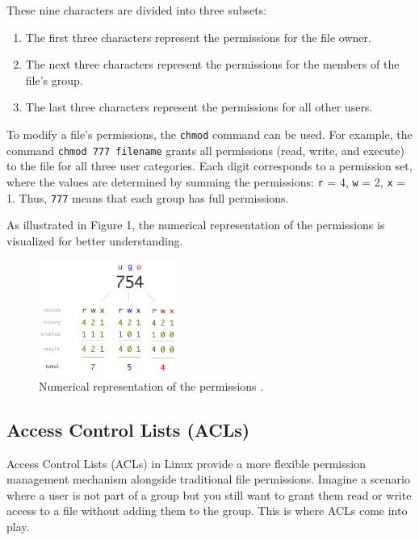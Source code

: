 \documentclass[conference]{IEEEtran}
\begin{document}
These nine characters are divided into three subsets:
\begin{enumerate}
    \item The first three characters represent the permissions for the file owner.
    \item The next three characters represent the permissions for the members of the file's group.
    \item The last three characters represent the permissions for all other users.
\end{enumerate}

To modify a file's permissions, the \texttt{chmod} command can be used. For example, the command \texttt{chmod 777 filename} grants all permissions (read, write, and execute) to the file for all three user categories. Each digit corresponds to a permission set, where the values are determined by summing the permissions: \texttt{r} = 4, \texttt{w} = 2, \texttt{x} = 1. Thus, \texttt{777} means that each group has full permissions.

As illustrated in Figure 1, the numerical representation of the permissions is visualized for better understanding.

\begin{figure}[H]
    \centering
    \includegraphics[width=0.4\textwidth]{fig1.jpg}
    \caption{Numerical representation of the permissions \cite{cloudxlab-permissions}.}
    \label{fig:filetypes}
\end{figure}

\subsection{Access Control Lists (ACLs)}

Access Control Lists (ACLs) in Linux provide a more flexible permission management mechanism alongside traditional file permissions. Imagine a scenario where a user is not part of a group but you still want to grant them read or write access to a file without adding them to the group. This is where ACLs come into play.
\end{document}
